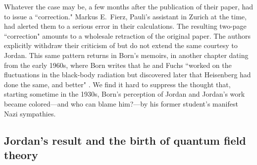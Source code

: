 \documentclass[12pt]{elsart}
\begin{document}
Whatever the case may be, a few months after the publication of their paper, \citet{Born and Fuchs 1939b} had to issue a ``correction."   Markus E.\ Fierz, Pauli's assistant in Zurich at the time, had alerted them to a serious error in their calculations. The resulting two-page ``correction" amounts to a wholesale retraction of the original paper. The authors explicitly withdraw their criticism of \citep{Heisenberg 1931} but do not extend the same courtesy to Jordan. This same pattern returns in Born's memoirs, in another chapter dating from the early 1960s, where Born writes that he and Fuchs ``worked on the fluctuations in the black-body radiation but discovered later that Heisenberg had done the same, and better" \citep[p.\ 285]{Born 1978}. We find it hard to suppress the thought that, starting sometime in the 1930s, Born's perception of Jordan and Jordan's work became colored---and who can blame him?---by his former student's manifest Nazi sympathies. 

\subsection{Jordan's result and the birth of quantum field theory}
\end{document}
